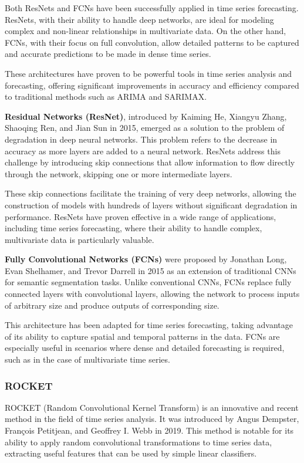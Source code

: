 Both ResNets and FCNs have been successfully applied in time series forecasting. ResNets, with their ability to handle deep networks, are ideal for modeling complex and non-linear relationships in multivariate data. On the other hand, FCNs, with their focus on full convolution, allow detailed patterns to be captured and accurate predictions to be made in dense time series.

These architectures have proven to be powerful tools in time series analysis and forecasting, offering significant improvements in accuracy and efficiency compared to traditional methods such as ARIMA and SARIMAX.
\vspace{10pt}

\textbf{Residual Networks (ResNet)}, introduced by Kaiming He, Xiangyu Zhang, Shaoqing Ren, and Jian Sun in 2015, emerged as a solution to the problem of degradation in deep neural networks. This problem refers to the decrease in accuracy as more layers are added to a neural network. ResNets address this challenge by introducing skip connections that allow information to flow directly through the network, skipping one or more intermediate layers.

These skip connections facilitate the training of very deep networks, allowing the construction of models with hundreds of layers without significant degradation in performance. ResNets have proven effective in a wide range of applications, including time series forecasting, where their ability to handle complex, multivariate data is particularly valuable.
\vspace{10pt}

\textbf{Fully Convolutional Networks (FCNs)}\cite{long2015fullyconvolutionalnetworkssemantic} were proposed by Jonathan Long, Evan Shelhamer, and Trevor Darrell in 2015 as an extension of traditional CNNs for semantic segmentation tasks. Unlike conventional CNNs, FCNs replace fully connected layers with convolutional layers, allowing the network to process inputs of arbitrary size and produce outputs of corresponding size.

This architecture has been adapted for time series forecasting, taking advantage of its ability to capture spatial and temporal patterns in the data. FCNs are especially useful in scenarios where dense and detailed forecasting is required, such as in the case of multivariate time series.
\vspace{10pt}

\subsubsection{ROCKET}
ROCKET (Random Convolutional Kernel Transform)\cite{Dempster_2020} is an innovative and recent method in the field of time series analysis. It was introduced by Angus Dempster, François Petitjean, and Geoffrey I. Webb in 2019. This method is notable for its ability to apply random convolutional transformations to time series data, extracting useful features that can be used by simple linear classifiers.

